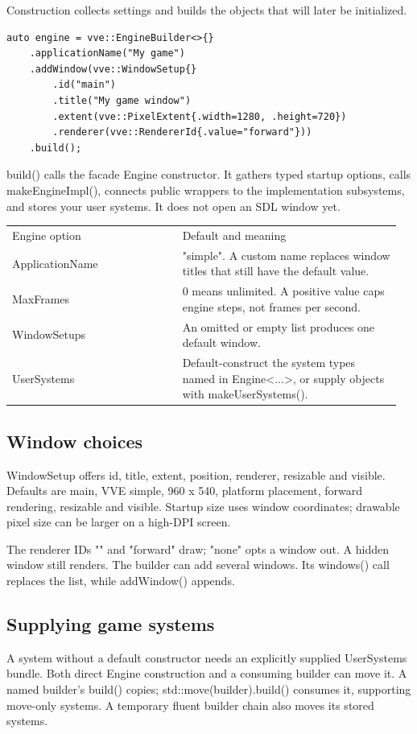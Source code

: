 \documentclass[11pt,a4paper]{article}
\begin{document}
\label{core-26}
Construction collects settings and builds the objects that will later be initialized.

\begin{lstlisting}[language={}]
auto engine = vve::EngineBuilder<>{}
    .applicationName("My game")
    .addWindow(vve::WindowSetup{}
        .id("main")
        .title("My game window")
        .extent(vve::PixelExtent{.width=1280, .height=720})
        .renderer(vve::RendererId{.value="forward"}))
    .build();
\end{lstlisting}

build() calls the facade Engine constructor. It gathers typed startup options, calls makeEngineImpl(), connects public wrappers to the implementation subsystems, and stores your user systems. It does not open an SDL window yet.

{\small
\begin{longtable}{@{}p{0.42\linewidth}p{0.54\linewidth}@{}}
Engine option & Default and meaning \\
ApplicationName & "simple". A custom name replaces window titles that still have the default value. \\
MaxFrames & 0 means unlimited. A positive value caps engine steps, not frames per second. \\
WindowSetups & An omitted or empty list produces one default window. \\
UserSystems & Default-construct the system types named in Engine<...>, or supply objects with makeUserSystems(). \\
\end{longtable}
}

\subsection*{Window choices}
WindowSetup offers id, title, extent, position, renderer, resizable and visible. Defaults are main, VVE simple, 960 x 540, platform placement, forward rendering, resizable and visible. Startup size uses window coordinates; drawable pixel size can be larger on a high-DPI screen.

The renderer IDs "" and "forward" draw; "none" opts a window out. A hidden window still renders. The builder can add several windows. Its windows() call replaces the list, while addWindow() appends.

\subsection*{Supplying game systems}
A system without a default constructor needs an explicitly supplied UserSystems bundle. Both direct Engine construction and a consuming builder can move it. A named builder's build() copies; std::move(builder).build() consumes it, supporting move-only systems. A temporary fluent builder chain also moves its stored systems.
\end{document}
